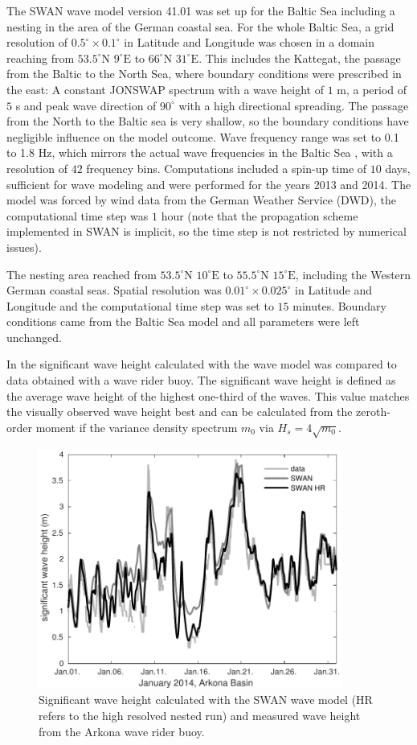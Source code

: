 The SWAN wave model version 41.01 was set up for the Baltic Sea including a 
nesting in the area of the German coastal sea. For the whole Baltic Sea, a grid 
resolution of $0.5^\circ \times 0.1^\circ $ in Latitude and Longitude was 
chosen 
in a domain reaching from $53.5^\circ \text{N } 9^\circ \text{E}$ to $66^\circ 
\text{N } 31^\circ \text{E}$. This includes the Kattegat, the passage from the 
Baltic to the North Sea, where boundary conditions were prescribed in the east: 
A constant JONSWAP spectrum with a wave height of $1$ m, a period of $5$ s and 
peak wave direction of $90^\circ$ with a high directional spreading. The 
passage 
from the North to the Baltic sea is very shallow, so the boundary conditions 
have negligible influence on the model outcome. Wave frequency range was set to 
0.1 to 1.8 Hz, which mirrors the actual wave frequencies in the Baltic 
Sea \citep[][]{balticsea}, with a resolution of $42$ frequency bins. 
Computations included a spin-up time of $10$ days, sufficient for wave modeling 
and were performed for the years 2013 and 2014. The model was forced by wind 
data from the German Weather Service (DWD), the computational time step was $1$ 
hour (note that the propagation scheme implemented in SWAN is implicit, so the 
time step is not restricted by numerical issues). 

The nesting area reached from $53.5^\circ \text{N } 10^\circ \text{E}$ to 
$55.5^\circ \text{N } 15^\circ \text{E}$, including the Western German coastal 
seas. Spatial resolution was $0.01^\circ \times 0.025^\circ $ in Latitude and 
Longitude and the computational time step was set to $15$ minutes. Boundary 
conditions came from the Baltic Sea model and all parameters were left 
unchanged.

In  the significant wave height calculated with the wave model was 
compared to data obtained with a wave rider buoy. The significant wave height 
is defined as the average wave height of the highest one-third of the waves. 
This value matches the visually observed wave height best and can be calculated 
from the zeroth-order moment if the variance density spectrum $m_0$ via 
$H_s = 4 \sqrt{m_0}$.
\begin{figure}[ht]
 \includegraphics[width=10cm]{bilder/januar.pdf}
 \caption{Significant wave height calculated with the SWAN wave model (HR 
refers to the high resolved nested run) and measured wave height from the 
Arkona wave rider buoy.\label{verify}}
\end{figure}

